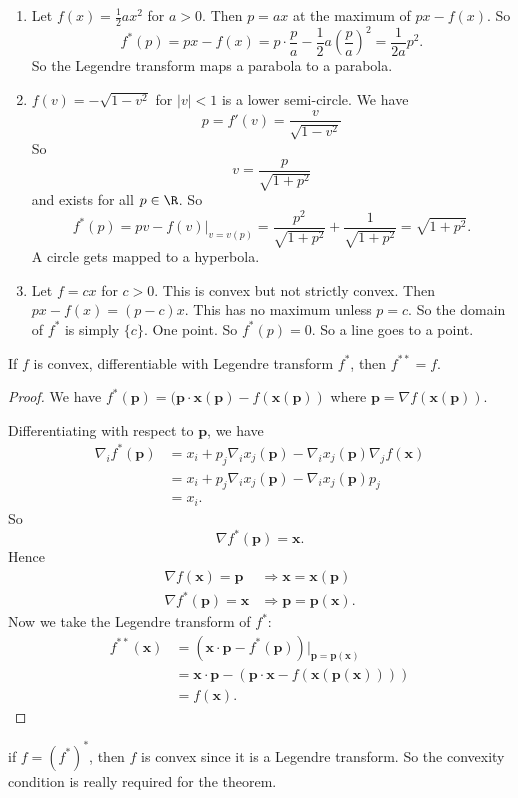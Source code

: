 \documentclass[a4paper]{article}
\begin{document}
\begin{eg}\leavevmode
  \begin{enumerate}
    \item Let $f(x) = \frac{1}{2}ax^2$ for $a > 0$. Then $p = ax$ at the maximum of $px - f(x)$. So
      \[
        f^*(p) = px - f(x) = p\cdot \frac{p}{a} - \frac{1}{2}a\left(\frac{p}{a}\right)^2 = \frac{1}{2a}p^2.
      \]
      So the Legendre transform maps a parabola to a parabola.
    \item $f(v) = -\sqrt{1 - v^2}$ for $|v| < 1$ is a lower semi-circle. We have
      \[
        p = f'(v) = \frac{v}{\sqrt{1 - v^2}}
      \]
      So
      \[
        v = \frac{p}{\sqrt{1 + p^2}}
      \]
      and exists for all $p\in \R$. So
      \[
        f^*(p) = pv - f(v)|_{v = v(p)} = \frac{p^2}{\sqrt{1 + p^2}} + \frac{1}{\sqrt{1 + p^2}} = \sqrt{1 + p^2}.
      \]
      A circle gets mapped to a hyperbola.
    \item Let $f = cx$ for $c > 0$. This is convex but not strictly convex. Then $px - f(x) = (p - c)x$. This has no maximum unless $p = c$. So the domain of $f^*$ is simply $\{c\}$. One point. So $f^*(p) = 0$. So a line goes to a point.
  \end{enumerate}
\end{eg}
\begin{thm}
  If $f$ is convex, differentiable with Legendre transform $f^*$, then $f^{**} = f$. 
\end{thm}

\begin{proof}
  We have $f^*(\mathbf{p}) = (\mathbf{p}\cdot\mathbf{x}(\mathbf{p}) - f(\mathbf{x}(\mathbf{p}))$ where $\mathbf{p} = \nabla f(\mathbf{x}(\mathbf{p}))$.

  Differentiating with respect to $\mathbf{p}$, we have
  \begin{align*}
    \nabla_i f^*(\mathbf{p}) &= x_i + p_j \nabla_i x_j (\mathbf{p}) - \nabla_i x_j(\mathbf{p}) \nabla_j f(\mathbf{x})\\
    &= x_i + p_j \nabla_i x_j(\mathbf{p}) - \nabla_i x_j(\mathbf{p}) p_j\\
    &= x_i.
  \end{align*}
  So
  \[
    \nabla f^*(\mathbf{p}) = \mathbf{x}.
  \]
  Hence
  \begin{align*}
    \nabla f(\mathbf{x}) = \mathbf{p} &\Rightarrow \mathbf{x} = \mathbf{x}(\mathbf{p})\\
    \nabla f^*(\mathbf{p}) = \mathbf{x} &\Rightarrow \mathbf{p} = \mathbf{p}(\mathbf{x}).
  \end{align*}
  Now we take the Legendre transform of $f^*$:
  \begin{align*}
    f^{**}(\mathbf{x}) &= (\mathbf{x} \cdot \mathbf{p} - f^*(\mathbf{p}))|_{\mathbf{p} = \mathbf{p}(\mathbf{x})}\\
    &= \mathbf{x}\cdot \mathbf{p} - (\mathbf{p}\cdot \mathbf{x} - f(\mathbf{x}(\mathbf{p}(\mathbf{x}))))\\
    &= f(\mathbf{x}).
  \end{align*}
\end{proof}
\note if $f = (f^*)^*$, then $f$ is convex since it is a Legendre transform. So the convexity condition is really required for the theorem.
\end{document}
